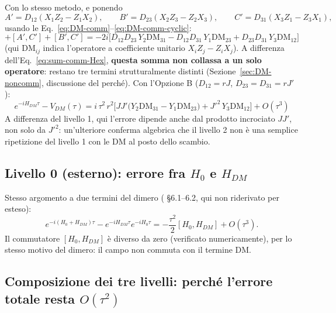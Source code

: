 \documentclass[11pt,a4paper]{article}
\begin{document}
Con lo stesso metodo, e ponendo
\begin{equation*}
A'=D_{12}(X_1Z_2{-}Z_1X_2), \qquad B'=D_{23}(X_2Z_3{-}Z_2X_3), \qquad C'=D_{31}(X_3Z_1{-}Z_3X_1),
\end{equation*}
usando le Eq.~\eqref{eq:DM-comm}--\eqref{eq:DM-comm-cyclic}:
\begin{equation}
[A',B']+[A',C']+[B',C'] = -2i\Big[D_{12}D_{23}\,Y_2\text{DM}_{31} - D_{12}D_{31}\,Y_1\text{DM}_{23} + D_{23}D_{31}\,Y_3\text{DM}_{12}\Big]
\label{eq:sum-comm-HDM}
\end{equation}
(qui $\text{DM}_{ij}$ indica l'operatore a coefficiente unitario $X_iZ_j-Z_iX_j$). A differenza dell'Eq.~\eqref{eq:sum-comm-Hex}, \textbf{questa somma non collassa a un solo operatore}: restano tre termini strutturalmente distinti (Sezione~\ref{sec:DM-noncomm}, discussione del perché). Con l'Opzione B ($D_{12}=rJ$, $D_{23}=D_{31}=rJ'$):
\begin{equation}
\boxed{e^{-iH_{DM}\tau} - V_{DM}(\tau) = i\,\tau^2\,r^2\Big[JJ'\big(Y_2\text{DM}_{31}-Y_1\text{DM}_{23}\big) + J'^2\,Y_3\text{DM}_{12}\Big] + O(\tau^3)}
\label{eq:error-HDM-final}
\end{equation}
A differenza del livello 1, qui l'errore dipende anche dal prodotto incrociato $JJ'$, non solo da $J'^2$: un'ulteriore conferma algebrica che il livello 2 non è una semplice ripetizione del livello 1 con le DM al posto dello scambio.

\subsection{Livello 0 (esterno): errore fra $H_0$ e $H_{DM}$}

Stesso argomento a due termini del dimero (\texttt{} \S6.1--6.2, qui non riderivato per esteso):
\begin{equation}
e^{-i(H_0+H_{DM})\tau} - e^{-iH_{DM}\tau}e^{-iH_0\tau} = -\frac{\tau^2}{2}[H_0,H_{DM}] + O(\tau^3).
\label{eq:error-outer}
\end{equation}
Il commutatore $[H_0,H_{DM}]$ è diverso da zero (verificato numericamente), per lo stesso motivo del dimero: il campo non commuta con il termine DM.

\subsection{Composizione dei tre livelli: perché l'errore totale resta $O(\tau^2)$}
\end{document}
